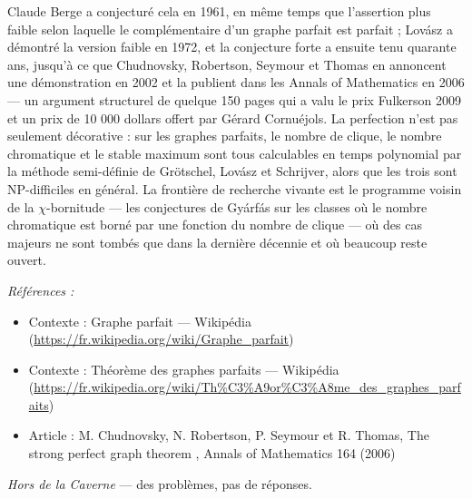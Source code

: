 \documentclass[11pt]{article}
\newenvironment{refs}{\par\small\noindent\emph{Références :}\begin{itemize}\setlength\itemsep{0pt}}{\end{itemize}\normalsize}
\begin{document}
\noindent Claude Berge a conjecturé cela en 1961, en même temps que l'assertion plus faible selon laquelle le complémentaire d'un graphe parfait est parfait ; Lovász a démontré la version faible en 1972, et la conjecture forte a ensuite tenu quarante ans, jusqu'à ce que Chudnovsky, Robertson, Seymour et Thomas en annoncent une démonstration en 2002 et la publient dans les Annals of Mathematics en 2006 --- un argument structurel de quelque 150 pages qui a valu le prix Fulkerson 2009 et un prix de 10 000 dollars offert par Gérard Cornuéjols. La perfection n'est pas seulement décorative : sur les graphes parfaits, le nombre de clique, le nombre chromatique et le stable maximum sont tous calculables en temps polynomial par la méthode semi-définie de Grötschel, Lovász et Schrijver, alors que les trois sont NP-difficiles en général. La frontière de recherche vivante est le programme voisin de la $\chi$-bornitude --- les conjectures de Gyárfás sur les classes où le nombre chromatique est borné par une fonction du nombre de clique --- où des cas majeurs ne sont tombés que dans la dernière décennie et où beaucoup reste ouvert.

\begin{refs}
\item Contexte : Graphe parfait --- Wikipédia (\url{https://fr.wikipedia.org/wiki/Graphe_parfait})
\item Contexte : Théorème des graphes parfaits --- Wikipédia (\url{https://fr.wikipedia.org/wiki/Th%C3%A9or%C3%A8me_des_graphes_parfaits})
\item Article : M. Chudnovsky, N. Robertson, P. Seymour et R. Thomas, \og{} The strong perfect graph theorem \fg{}, Annals of Mathematics 164 (2006)
\end{refs}

\bigskip


\vfill
\noindent\emph{Hors de la Caverne} --- des probl\`emes, pas de r\'eponses.
\end{document}
